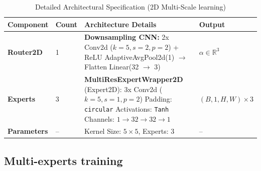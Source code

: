 \documentclass[preprint,12pt,authoryear]{elsarticle}
\begin{document}
\begin{table}[ht]
\centering
\caption{Detailed Architectural Specification (2D Multi-Scale learning)}
\label{tab:softmax_combiner_2d}
\small
\begin{tabularx}{\textwidth}{@{} ll X l @{}}
\toprule
\textbf{Component} & \textbf{Count} & \textbf{Architecture Details} & \textbf{Output} \\ \midrule

\textbf{Router2D} & 1 & \textbf{Downsampling CNN:} \newline 
2x Conv2d ($k=5, s=2, p=2$) + ReLU \newline 
AdaptiveAvgPool2d(1) $\to$ Flatten \newline 
Linear(32 $\to$ 3) & $\alpha \in \mathbb{R}^{3}$ \\ \addlinespace

\textbf{Experts} & 3 & \textbf{MultiResExpertWrapper2D} (Expert2D): \newline
3x Conv2d ($k=5, s=1, p=2$) \newline
Padding: \texttt{circular} \newline
Activations: \texttt{Tanh} \newline
Channels: $1 \to 32 \to 32 \to 1$ & $(B, 1, H, W) \times 3$ \\ \addlinespace

\textbf{Parameters} & -- & Kernel Size: $5 \times 5$, Experts: 3 & -- \\ 
\bottomrule
\end{tabularx}
\end{table}

\subsection{Multi-experts training}
\end{document}
